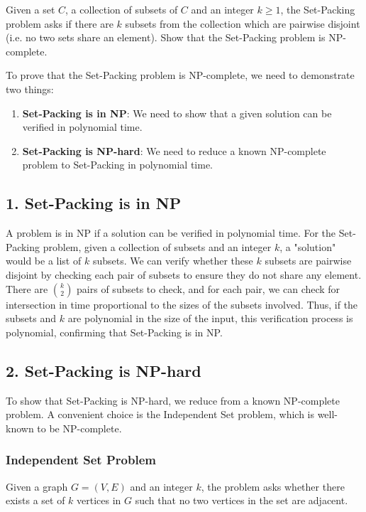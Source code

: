 \problem{}

Given a set $C$, a collection of subsets of $C$ and an integer $k \geq 1$, the Set-Packing problem asks if there are $k$ subsets from the collection which are pairwise disjoint (i.e. no two sets share an element). Show that the Set-Packing problem is NP-complete.

\solution{}



To prove that the Set-Packing problem is NP-complete, we need to demonstrate two things:

\begin{enumerate}
    \item \textbf{Set-Packing is in NP}: We need to show that a given solution can be verified in polynomial time.
    \item \textbf{Set-Packing is NP-hard}: We need to reduce a known NP-complete problem to Set-Packing in polynomial time.
\end{enumerate}

\subsection*{1. Set-Packing is in NP}
A problem is in NP if a solution can be verified in polynomial time. For the Set-Packing problem, given a collection of subsets and an integer \( k \), a "solution" would be a list of \( k \) subsets. We can verify whether these \( k \) subsets are pairwise disjoint by checking each pair of subsets to ensure they do not share any element. There are \( \binom{k}{2} \) pairs of subsets to check, and for each pair, we can check for intersection in time proportional to the sizes of the subsets involved. Thus, if the subsets and \( k \) are polynomial in the size of the input, this verification process is polynomial, confirming that Set-Packing is in NP.

\subsection*{2. Set-Packing is NP-hard}
To show that Set-Packing is NP-hard, we reduce from a known NP-complete problem. A convenient choice is the Independent Set problem, which is well-known to be NP-complete.

\subsubsection*{Independent Set Problem}
Given a graph \( G = (V, E) \) and an integer \( k \), the problem asks whether there exists a set of \( k \) vertices in \( G \) such that no two vertices in the set are adjacent.

